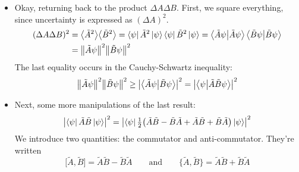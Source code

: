 \documentclass[11pt, a4paper]{article}
\newcommand{\eqtext}[1]{\qquad \text{#1} \qquad}
\begin{document}
\begin{itemize}
	\item Okay, returning back to the product $ \Delta A \Delta B $. First, we square everything, since uncertainty is expressed as $ (\Delta A)^{2} $. 
	\begin{align*}
		(\Delta A \Delta B)^{2} &= \big\langle \tilde{A}^{2} \big\rangle \big\langle \tilde{B}^{2} \big\rangle = \bra{\psi}\tilde{A}^{2}\ket{\psi} \bra{\psi}\tilde{B}^{2}\ket{\psi} = \braket{\tilde{A}\psi}{\tilde{A}\psi}\braket{\tilde{B}\psi}{\tilde{B}\psi}\\
		&= \norm{\tilde{A}\psi}^{2}\norm{\tilde{B}\psi}^{2}
	\end{align*}
	The last equality occurs in the Cauchy-Schwartz inequality:
	\begin{equation*}
		\norm{\tilde{A}\psi}^{2}\norm{\tilde{B}\psi}^{2} \geq \abs{\braket{\tilde{A}\psi}{\tilde{B}\psi}}^{2} = \abs{\braket{\psi}{\tilde{A}\tilde{B}\psi}}^{2}
	\end{equation*}
	
	\item Next, some more manipulations of the last result:
	\begin{equation*}
		 \abs{\bra{\psi}\tilde{A}\tilde{B}\ket{\psi}}^{2} = \abs{\bra{\psi}\tfrac{1}{2}\big(\tilde{A}\tilde{B} - \tilde{B}\tilde{A} + \tilde{A}\tilde{B} + \tilde{B}\tilde{A}\big)\ket{\psi} }^{2}
	\end{equation*}
	We introduce two quantities: the commutator and anti-commutator. They're written
	\begin{equation*}
		\big[\tilde{A}, \tilde{B}\big] = \tilde{A}\tilde{B} - \tilde{B}\tilde{A} \eqtext{and} \big\{\tilde{A}, \tilde{B}\big\} = \tilde{A}\tilde{B} + \tilde{B}\tilde{A}
	\end{equation*} 
\end{itemize}
\end{document}
